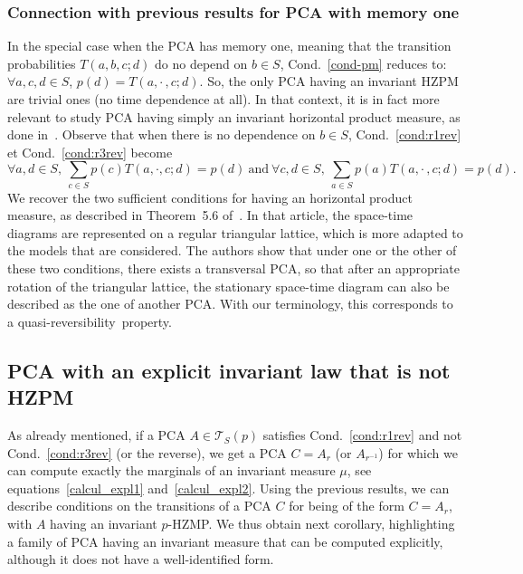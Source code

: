 \documentclass[AHL,Unicode,longabstracts]{cedram}
\newcounter{a}
\newcommand{\Cond}{Cond.}
\newcommand{\triang}[2]{\mathcal{T}_{#1} \left(#2 \right)}
\let\oldforall\forall
\renewcommand*{\forall}{\mathrel{\oldforall}}
\begin{document}
\subsubsection*{Connection with previous results for PCA with memory one}
In the special case when the PCA has memory one, meaning that the transition probabilities $T(a,b,c;d)$ do no depend on $b\in S$, \Cond~\ref{cond-pm} reduces to: $\forall a,c,d\in S$, $p(d)=T(a,\cdot\,, c ; d).$ So, the only PCA having an invariant HZPM are trivial ones (no time dependence at all). In that context, it is in fact more relevant to study PCA having simply an invariant horizontal product measure, as done in~\cite{mm_ihp}. Observe that when there is no dependence on $b\in S$, \Cond~\ref{cond:r1rev} et \Cond~\ref{cond:r3rev} become
\[
\forall a,d \in S,\ \sum_{c \in S} p(c) T(a,\cdot,c;d) = p(d) \ \text{and} \ \forall c,d \in S,\ \sum_{a \in S} p(a) T(a,\cdot\,,c;d) = p(d).
\]
We recover the two sufficient conditions for having an horizontal product measure, as described in Theorem~5.6 of~\cite{mm_ihp}. In that article, the space-time diagrams are represented on a regular triangular lattice, which is more adapted to the models that are considered. The authors show that under one or the other of these two conditions, there exists a transversal PCA, so that after an appropriate rotation of the triangular lattice, the stationary space-time diagram can also be described as the one of another PCA. With our terminology, this corresponds to a quasi-reversibility~property.

\subsection{PCA with an explicit invariant law that is not HZPM}\label{notHZPM}

As already mentioned, if a PCA $A \in \triang{S}{p}$ satisfies \Cond~\ref{cond:r1rev} and not \Cond~\ref{cond:r3rev} (or the reverse), we get a PCA $C=A_r$ (or $A_{r^{-1}}$) for which we can compute exactly the marginals of an invariant measure $\mu$, see equations~\eqref{calcul_expl1} and~\eqref{calcul_expl2}. Using the previous results, we can describe conditions on the transitions of a PCA $C$ for being of the form $C=A_r$, with $A$ having an invariant $p$-HZMP. We thus obtain next corollary, highlighting a family of PCA having an invariant measure that can be computed explicitly, although it does not have a well-identified form.
\end{document}
